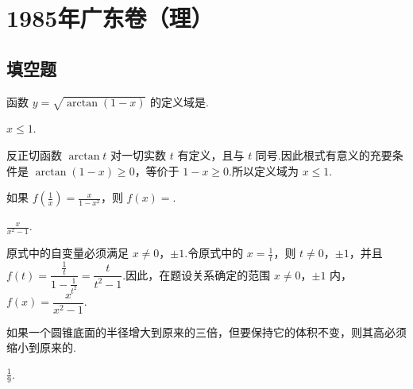 \documentclass[UTF8,a4paper,oneside,11pt]{ctexbook}
\begin{document}
\mainmatter

\chapter{1985年广东卷（理）}

\section{填空题}

\begin{problem}

函数 \(y = \sqrt{\arctan(1 - x)} \) 的定义域是\fillinblank{}.
\end{problem}

\begin{answer}
\(x \leqslant 1\).
\end{answer}

\begin{solution}
反正切函数 \(\arctan t\) 对一切实数 \(t\) 有定义，且与 \(t\) 同号.因此根式有意义的充要条件是 \(\arctan(1-x)\geqslant0\)，等价于 \(1-x\geqslant0\).所以定义域为 \(x\leqslant1\).
\end{solution}

\begin{problem}

如果 \(f\left(\frac{1}{x}\right)=\frac{x}{1-x^{2}} \)，则 \(f(x)= \)\fillinblank{}.
\end{problem}

\begin{answer}
\(\displaystyle \frac{x}{x^{2}-1}\).
\end{answer}

\begin{solution}
原式中的自变量必须满足 \(x\ne0\)，\(\pm1\).令原式中的 \(x=\frac1t\)，则 \(t\ne0\)，\(\pm1\)，并且 \(f(t)=\dfrac{\frac{1}{t}}{1-\frac{1}{t^{2}}}=\dfrac{t}{t^{2}-1}\).因此，在题设关系确定的范围 \(x\ne0\)，\(\pm1\) 内，\(f(x)=\dfrac{x}{x^{2}-1}\).
\end{solution}

\begin{problem}

如果一个圆锥底面的半径增大到原来的三倍，但要保持它的体积不变，则其高必须缩小到原来的\fillinblank{}.
\end{problem}

\begin{answer}
\(\displaystyle \frac{1}{9}\).
\end{answer}
\end{document}
